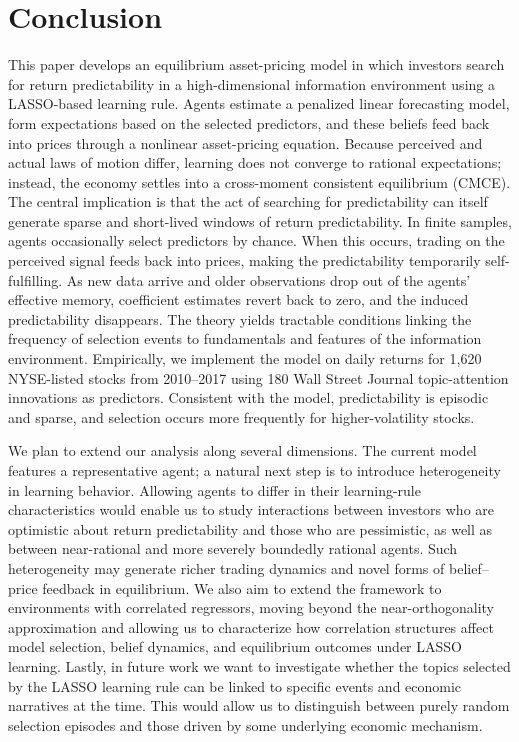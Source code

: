\documentclass[11pt]{article}
\begin{document}

\section{Conclusion}\label{sec:conclusion}

This paper develops an equilibrium asset-pricing model in which investors search for return predictability in a high-dimensional information environment using a LASSO-based learning rule.
Agents estimate a penalized linear forecasting model, form expectations based on the selected predictors, and these beliefs feed back into prices through a nonlinear asset-pricing equation.
Because perceived and actual laws of motion differ, learning does not converge to rational expectations; instead, the economy settles into a cross-moment consistent equilibrium (CMCE).
The central implication is that the act of searching for predictability can itself generate sparse and short-lived windows of return predictability.
In finite samples, agents occasionally select predictors by chance.
When this occurs, trading on the perceived signal feeds back into prices, making the predictability temporarily self-fulfilling.
As new data arrive and older observations drop out of the agents’ effective memory, coefficient estimates revert back to zero, and the induced predictability disappears.
The theory yields tractable conditions linking the frequency of selection events to fundamentals and features of the information environment.
Empirically, we implement the model on daily returns for 1{,}620 NYSE-listed stocks from 2010--2017 using 180 Wall Street Journal topic-attention innovations as predictors.
Consistent with the model, predictability is episodic and sparse, and selection occurs more frequently for higher-volatility stocks.


We plan to extend our analysis along several dimensions.
The current model features a representative agent; a natural next step is to introduce heterogeneity in learning behavior.
Allowing agents to differ in their learning-rule characteristics would enable us to study interactions between investors who are optimistic about return predictability and those who are pessimistic, as well as between near-rational and more severely boundedly rational agents.
Such heterogeneity may generate richer trading dynamics and novel forms of belief--price feedback in equilibrium.
We also aim to extend the framework to environments with correlated regressors, moving beyond the near-orthogonality approximation and allowing us to characterize how correlation structures affect model selection, belief dynamics, and equilibrium outcomes under LASSO learning.
Lastly, in future work we want to investigate whether the topics selected by the LASSO learning rule can be linked to specific events and economic narratives at the time. 
This would allow us to distinguish between purely random selection episodes and those driven by some underlying economic mechanism.
\end{document}
